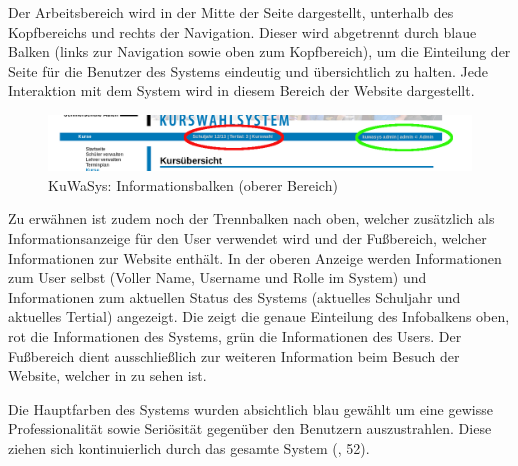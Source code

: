 Der Arbeitsbereich wird in der Mitte der Seite dargestellt, unterhalb des Kopfbereichs und rechts der Navigation. 
Dieser wird abgetrennt durch blaue Balken (links zur Navigation sowie oben zum Kopfbereich), um die Einteilung der Seite für die Benutzer des Systems eindeutig und übersichtlich zu halten.
Jede Interaktion mit dem System wird in diesem Bereich der Website dargestellt. 

\begin{figure}[h]
 \begin{center}
   \includegraphics[scale=0.4]{img/informationbar_KuWaSys.png}
 \end{center}
 \caption[\textbf{KuWaSys: Informationsbalken (oberer Bereich)}]{KuWaSys: Informationsbalken (oberer Bereich)}
 \label{fig:infobar_KuWaSys}
\end{figure}

Zu erwähnen ist zudem noch der Trennbalken nach oben, welcher zusätzlich als Informationsanzeige für den User verwendet wird und der Fußbereich, welcher Informationen zur Website enthält. 
In der oberen Anzeige werden Informationen zum User selbst (Voller Name, Username und Rolle im System) und Informationen zum aktuellen Status des Systems (aktuelles Schuljahr und aktuelles Tertial) angezeigt.
Die  zeigt die genaue Einteilung des Infobalkens oben, rot die Informationen des Systems, grün die Informationen des Users.
Der Fußbereich dient ausschließlich zur weiteren Information beim Besuch der Website, welcher in  zu sehen ist.  

Die Hauptfarben des Systems wurden absichtlich blau gewählt um eine gewisse Professionalität sowie Seriösität gegenüber den Benutzern auszustrahlen. Diese ziehen sich kontinuierlich durch das gesamte System (\cite{DahmM-GdMCI}, 52).

